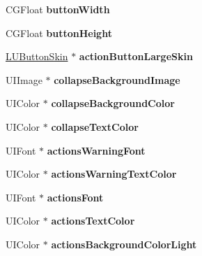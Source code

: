 \begin{DoxyCompactItemize}
C\+G\+Float {\bfseries button\+Width}
\item 
\mbox{\label{category_l_u_theme_07_08_af4d10d705b34165e52ec13801fa29a98}} 
C\+G\+Float {\bfseries button\+Height}
\item 
\mbox{\label{category_l_u_theme_07_08_a64cd459b66cab62fce2aa885224c0dc8}} 
\mbox{\hyperlink{interface_l_u_button_skin}{L\+U\+Button\+Skin}} $\ast$ {\bfseries action\+Button\+Large\+Skin}
\item 
\mbox{\label{category_l_u_theme_07_08_ab6443223e33e30c90c931bdf93a8dd09}} 
U\+I\+Image $\ast$ {\bfseries collapse\+Background\+Image}
\item 
\mbox{\label{category_l_u_theme_07_08_afd6fe9b964956fb310bf6aa70c004bf2}} 
U\+I\+Color $\ast$ {\bfseries collapse\+Background\+Color}
\item 
\mbox{\label{category_l_u_theme_07_08_ae4c93c1bd771af07acd44c260cbf1600}} 
U\+I\+Color $\ast$ {\bfseries collapse\+Text\+Color}
\item 
\mbox{\label{category_l_u_theme_07_08_ac3b413dbafde6c37bd3a387f6f4b2805}} 
U\+I\+Font $\ast$ {\bfseries actions\+Warning\+Font}
\item 
\mbox{\label{category_l_u_theme_07_08_a602bf19d703d6bf8a13fed51a4a4dac3}} 
U\+I\+Color $\ast$ {\bfseries actions\+Warning\+Text\+Color}
\item 
\mbox{\label{category_l_u_theme_07_08_a26a6350c0461912b2716a22cd969ab17}} 
U\+I\+Font $\ast$ {\bfseries actions\+Font}
\item 
\mbox{\label{category_l_u_theme_07_08_a4be44c0ff3bb217414e9d7f2c8eb7cf3}} 
U\+I\+Color $\ast$ {\bfseries actions\+Text\+Color}
\item 
\mbox{\label{category_l_u_theme_07_08_a7fbbafc22fa56ad4a6a600a81d6b4efa}} 
U\+I\+Color $\ast$ {\bfseries actions\+Background\+Color\+Light}
\item 

\end{DoxyCompactItemize}
